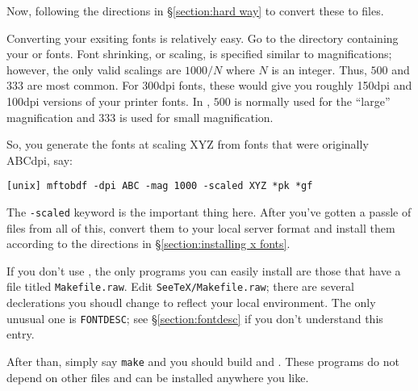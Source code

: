 Now, following the directions in \S\ref{section:hard way} to convert
these to {\BDF} files.


Converting your exsiting fonts is relatively easy. Go to the directory
containing your {\PK} or {\GF} fonts.
Font shrinking, or scaling, is specified similar to
magnifications; however, the only valid scalings are $1000/N$ where
$N$ is an integer.  Thus, $500$ and $333$ are most common. For 300dpi
fonts, these would give you roughly 150dpi and 100dpi versions of your
printer fonts. In {\xtex}, $500$ is normally used for the ``large''
magnification and $333$ is used for small magnification.

So, you generate the fonts at scaling XYZ from fonts that were
originally ABCdpi, say:
\begin{verbatim}
[unix] mftobdf -dpi ABC -mag 1000 -scaled XYZ *pk *gf  
\end{verbatim}

The {\tt -scaled} keyword is the important thing here. After you've
gotten a passle of {\BDF} files from all of this, convert them to your
local server format and install them according to the directions in
\S\ref{section:installing x fonts}.


If you don't use {\imake}, the only programs you can easily install
are those that have a file titled {\tt Makefile.raw}.
Edit \verb|SeeTeX/Makefile.raw|; there are several declerations you
shoudl change to reflect your local environment. The only unusual one
is {\tt FONTDESC}; see \S\ref{section:fontdesc} if you don't understand
this entry.

After than, simply say {\tt make} and you should build {\texsun} and
{\dviselect}. These programs do not depend on other files and can be
installed anywhere you like.




